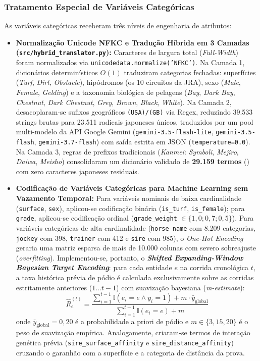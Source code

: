 \documentclass[conference]{IEEEtran}
\begin{document}
\subsubsection{Tratamento Especial de Variáveis Categóricas}
As variáveis categóricas receberam três níveis de engenharia de atributos:
\begin{itemize}
    \item \textbf{Normalização Unicode NFKC e Tradução Híbrida em 3 Camadas (\texttt{src/hybrid\_translator.py}):} Caracteres de largura total (\textit{Full-Width}) foram normalizados via \texttt{unicodedata.normalize('NFKC')}. Na Camada 1, dicionários determinísticos $O(1)$ traduziram categorias fechadas: superfícies (\textit{Turf}, \textit{Dirt}, \textit{Obstacle}), hipódromos (os 10 circuitos da JRA), sexo (\textit{Male}, \textit{Female}, \textit{Gelding}) e a taxonomia biológica de pelagens (\textit{Bay}, \textit{Dark Bay}, \textit{Chestnut}, \textit{Dark Chestnut}, \textit{Grey}, \textit{Brown}, \textit{Black}, \textit{White}). Na Camada 2, desacoplaram-se sufixos geográficos \texttt{(USA)/(GB)} via Regex, reduzindo 39.533 strings brutas para 23.511 radicais japoneses únicos, traduzidos por um pool multi-modelo da API Google Gemini (\texttt{gemini-3.5-flash-lite}, \texttt{gemini-3.5-flash}, \texttt{gemini-3.7-flash}) com saída estrita em JSON (\texttt{temperature=0.0}). Na Camada 3, regras de prefixos tradicionais (\textit{Kanmei}: \textit{Symboli}, \textit{Mejiro}, \textit{Daiwa}, \textit{Meisho}) consolidaram um dicionário validado de \textbf{29.159 termos} () com zero caracteres japoneses residuais.
    \item \textbf{Codificação de Variáveis Categóricas para Machine Learning sem Vazamento Temporal:} Para variáveis nominais de baixa cardinalidade (\texttt{surface}, \texttt{sex}), aplicou-se codificação binária (\texttt{is\_turf}, \texttt{is\_female}); para \texttt{grade}, aplicou-se codificação ordinal (\texttt{grade\_weight} $\in \{1,0; 0,7; 0,5\}$). Para variáveis categóricas de alta cardinalidade (\texttt{horse\_name} com 8.209 categorias, \texttt{jockey} com 398, \texttt{trainer} com 412 e \texttt{sire} com 985), o \textit{One-Hot Encoding} geraria uma matriz esparsa de mais de 10.000 colunas com severo sobreajuste (\textit{overfitting}). Implementou-se, portanto, o \textbf{\textit{Shifted Expanding-Window Bayesian Target Encoding}}: para cada entidade $e$ na corrida cronológica $t$, a taxa histórica prévia de pódio é calculada exclusivamente sobre as corridas estritamente anteriores ($1 \dots t-1$) com suavização bayesiana (\textit{m-estimate}):
    \begin{equation}
        \hat{R}_{e}^{(t)} = \frac{\sum_{i=1}^{t-1} \mathbb{I}(e_i = e \land y_i = 1) + m \cdot \bar{y}_{\text{global}}}{\sum_{i=1}^{t-1} \mathbb{I}(e_i = e) + m}
    \end{equation}
    onde $\bar{y}_{\text{global}} = 0,20$ é a probabilidade a priori de pódio e $m \in \{3, 15, 20\}$ é o peso de suavização empírica. Analogamente, criaram-se termos de interação genética prévia (\texttt{sire\_surface\_affinity} e \texttt{sire\_distance\_affinity}) cruzando o garanhão com a superfície e a categoria de distância da prova.
\end{itemize}
\end{document}
